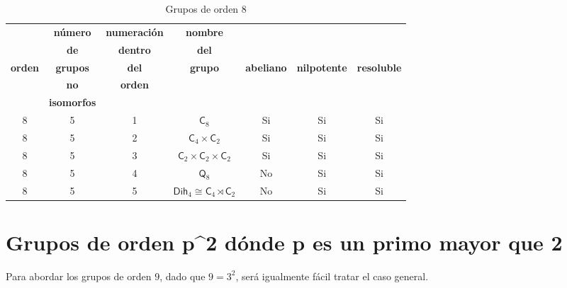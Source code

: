 \documentclass[final,12pt,a4paper,twoside,fleqn]{extbook}
\theoremstyle{definition}
\theoremstyle{remark}
\begin{document}
\begin{table}[h!]
    \begin{center}
        \caption{Grupos de orden $8$}
        \label{tab:GruposOrden8}
        \begin{tabular}{c|c|c|c|c|c|c} %
            \textbf{} & \tiny\textbf{n\'umero} &\tiny\textbf{numeraci\'on} & \tiny\textbf{nombre} & \textbf{} & {} & {} \\
            \textbf{} & \tiny\textbf{de} &\tiny\textbf{dentro} & \tiny\textbf{del} & \tiny\textbf{} & {} & {} \\
            \tiny\textbf{orden} & \tiny\textbf{grupos} & \tiny\textbf{del} & \tiny\textbf{grupo} & \tiny\textbf{abeliano}  & \tiny\textbf{nilpotente} & \tiny\textbf{resoluble} \\
            \textbf{} & \tiny\textbf{no} & \tiny\textbf{orden} & \textbf{} & \textbf{} & {} & {} \\
            \textbf{} & \tiny\textbf{isomorfos} &\textbf{} & \textbf{} & \textbf{} & {} & {} \\
            \hline
            8 & 5 & 1 & ${\textsf{C}}_{8}$ & Si & Si & Si \\
            \hline
            8 & 5 & 2  & ${{\textsf{C}}_{4}}                  \times                  {{\textsf{C}}_{2}}$ & Si & Si & Si \\
            \hline
            8 & 5 & 3 & ${{\textsf{C}}_{2}}                  \times                  {{\textsf{C}}_{2}}                  \times                  {{\textsf{C}}_{2}}$ & Si & Si & Si \\
            \hline
            8 & 5 & 4  & ${{\textsf{Q}}_{8}}$ & No & Si & Si \\
            \hline
            8 & 5 & 5 & ${{\textsf{Dih}}_{4}}                    \cong                    {{\textsf{C}}_{4}}\rtimes{{{\textsf{C}}_{2}}}$ & No & Si & Si \\
            \hline
        \end{tabular}
    \end{center}
\end{table}



\chapter{Grupos de orden p{\^{}}2 d\'onde p es un primo mayor que 2}


Para abordar los grupos de orden $9$, dado que $9=3^2$, ser\'a igualmente f\'acil tratar el caso general.
\end{document}
